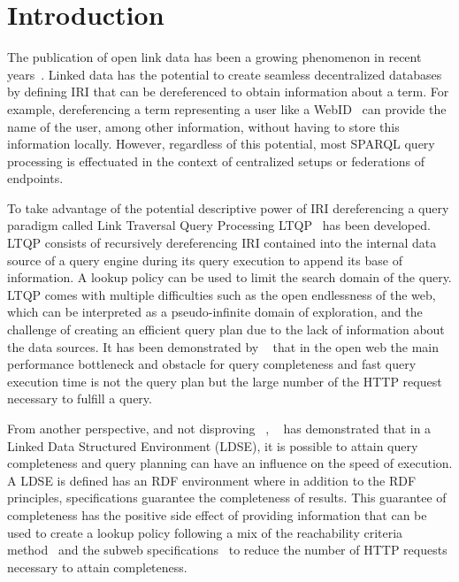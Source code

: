 \section{Introduction}

The publication of open link data has been a growing phenomenon in recent years~\cite{papadaki2018interactive}.
Linked data has the potential to create seamless decentralized databases by defining IRI that can be dereferenced to obtain information about a term.
For example, dereferencing a term representing a user like a WebID~ can provide the name of the user, among other information, without having 
to store this information locally.
However, regardless of this potential, most SPARQL query processing is effectuated in the context of centralized setups or federations of endpoints.

To take advantage of the potential descriptive power of IRI dereferencing a query paradigm called Link Traversal Query Processing LTQP~\cite{Hartig2012} has been developed.
LTQP consists of recursively dereferencing IRI contained into the internal data source of a query engine 
during its query execution to append its base of information.
A lookup policy can be used to limit the search domain of the query.
LTQP comes with multiple difficulties such as the open endlessness of the web, which can be interpreted as a pseudo-infinite domain of exploration,
and the challenge of creating an efficient query plan due to the lack of information about the data sources. 
It has been demonstrated by ~\citeauthor{hartig2016walking} that in the open web the main performance bottleneck and obstacle for query completeness and fast query execution time is not the query plan but the large number of the HTTP request necessary to fulfill a query.

From another perspective, and not disproving ~\citeauthor{hartig2016walking}, 
~\citeauthor{Taelman2023} has demonstrated that in a Linked Data Structured Environment (LDSE),
it is possible to attain query completeness and query planning can have an influence on the speed of execution.
A LDSE is defined has an RDF environment where in addition to the RDF principles, specifications
guarantee the completeness of results.
This guarantee of completeness has the positive side effect of providing information
that can be used to create a lookup policy following a mix of the reachability criteria method~\cite{Hartig2012, Taelman2023} and the subweb specifications~\cite{Bogaerts2021LinkTW}
to reduce the number of HTTP requests necessary to attain completeness.

